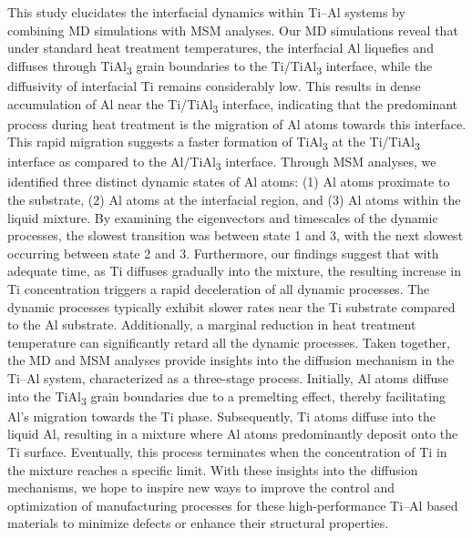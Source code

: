 This study elucidates the interfacial dynamics within Ti--Al systems by combining MD simulations with MSM analyses. Our MD simulations reveal that under standard heat treatment temperatures, the interfacial Al liquefies and diffuses through TiAl\textsubscript{3} grain boundaries to the Ti/TiAl\textsubscript{3} interface, while the diffusivity of interfacial Ti remains considerably low. This results in dense accumulation of Al near the Ti/TiAl\textsubscript{3} interface, indicating that the predominant process during heat treatment is the migration of Al atoms towards this interface. This rapid migration suggests a faster formation of TiAl\textsubscript{3} at the Ti/TiAl\textsubscript{3} interface as compared to the Al/TiAl\textsubscript{3} interface. Through MSM analyses, we identified three distinct dynamic states of Al atoms: (1) Al atoms proximate to the substrate, (2) Al atoms at the interfacial region, and (3) Al atoms within the liquid mixture. By examining the eigenvectors and timescales of the dynamic processes, the slowest transition was between state 1 and 3, with the next slowest occurring between state 2 and 3. Furthermore, our findings suggest that with adequate time, as Ti diffuses gradually into the mixture, the resulting increase in Ti concentration triggers a rapid deceleration of all dynamic processes. The dynamic processes typically exhibit slower rates near the Ti substrate compared to the Al substrate. Additionally, a marginal reduction in heat treatment temperature can significantly retard all the dynamic processes. Taken together, the MD and MSM analyses provide insights into the diffusion mechanism in the Ti--Al system, characterized as a three-stage process. Initially, Al atoms diffuse into the TiAl\textsubscript{3} grain boundaries due to a premelting effect, thereby facilitating Al's migration towards the Ti phase. Subsequently, Ti atoms diffuse into the liquid Al, resulting in a mixture where Al atoms predominantly deposit onto the Ti surface. Eventually, this process terminates when the concentration of Ti in the mixture reaches a specific limit. With these insights into the diffusion mechanisms, we hope to inspire new ways to improve the control and optimization of manufacturing processes for these high-performance Ti--Al based materials to minimize defects or enhance their structural properties.
